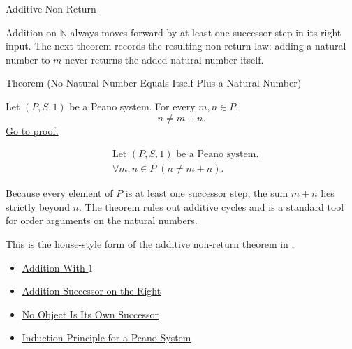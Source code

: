 \begin{topicbox}{Additive Non-Return}
\begin{exposition}
Addition on $\mathbb{N}$ always moves forward by at least one successor step
in its right input. The next theorem records the resulting non-return law:
adding a natural number to $m$ never returns the added natural number itself.
\end{exposition}

\begin{theorembox}{Theorem (No Natural Number Equals Itself Plus a Natural Number)}
\begin{theorem}
\label{thm:no-natural-number-equals-itself-plus-a-natural-number}
Let $(P,S,1)$ be a Peano system. For every $m,n \in P$,
\[
n \neq m+n.
\]
\hyperref[prf:no-natural-number-equals-itself-plus-a-natural-number]{Go to proof.}
\end{theorem}
\end{theorembox}

\begin{remark*}
\[
\begin{aligned}
&\text{Let } (P,S,1) \text{ be a Peano system.}\\
&\forall m,n \in P\;(n \neq m+n).
\end{aligned}
\]
\end{remark*}

\begin{remark*}[Interpretation]
Because every element of $P$ is at least one successor step, the sum $m+n$
lies strictly beyond $n$. The theorem rules out additive cycles and is a
standard tool for order arguments on the natural numbers.
\end{remark*}

\begin{remark*}
This is the house-style form of the additive non-return theorem in
\citep{FefermanNumberSystems1964}.
\end{remark*}

\begin{dependencies}
\begin{itemize}
  \item \hyperref[thm:addition-with-one]{Addition With $1$}
  \item \hyperref[thm:addition-successor-on-right]{Addition Successor on the Right}
  \item \hyperref[thm:no-object-is-its-own-successor]{No Object Is Its Own Successor}
  \item \hyperref[thm:induction-principle-for-peano-system]{Induction Principle for a Peano System}
\end{itemize}
\end{dependencies}
\end{topicbox}
